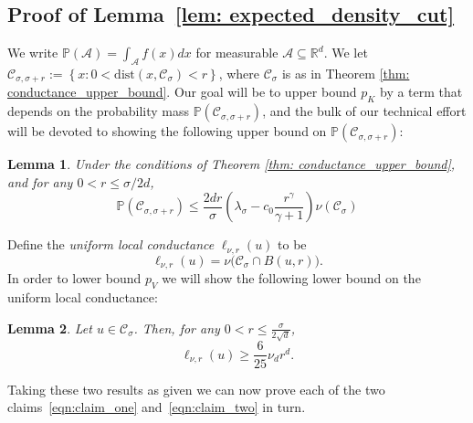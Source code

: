 \documentclass[11pt,twoside]{article}
\newtheorem{lemma}{Lemma}
\newcommand{\set}[1]{\left\{#1\right\}}
\newcommand{\Reals}{\mathbb{R}}
\newcommand{\Rd}{\Reals^d}
\newcommand{\1}{\mathbf{1}}
\newcommand{\dist}{\mathrm{dist}}
\newcommand{\Xbf}{X}             %
\newcommand{\Pbb}{\mathbb{P}}
\newcommand{\Cset}{\mathcal{C}}
\newcommand{\Aset}{\mathcal{A}}
\newcommand{\Csig}{\Cset_{\sigma}}
\newcommand{\Csigr}{\Cset_{\sigma,\sigma + r}}
\begin{document}
\subsection{Proof of Lemma~\ref{lem: expected_density_cut}}
We write $\Pbb(\Aset) = \int_{\Aset} f(x) dx$ for measurable $\Aset \subseteq \Rd$.
We 
let $\Csigr := \set{x: 0 < \dist(x, \Csig) < r}$, where $\Csig$ is as in Theorem \ref{thm: conductance_upper_bound}. 
Our goal will be to upper bound $p_K$ by a term that depends on the probability mass $\Pbb(\Csigr)$, 
and the bulk of our technical effort will be devoted to showing the following upper bound on $\Pbb(\Csigr)$:
\begin{lemma}
	\label{lem: expected_number_boundary_points}
	Under the conditions of Theorem \ref{thm: conductance_upper_bound}, and for any $0 < r \leq \sigma/2d$,
	\begin{equation*}
	\Pbb(\Csigr) \leq \frac{2dr}{\sigma} \left(\lambda_{\sigma} - c_0\frac{r^{\gamma}}{\gamma + 1}\right) \nu(\Csig)
	\end{equation*}	
\end{lemma}
\noindent Define the \emph{uniform local conductance} $\ell_{\nu,r}(u)$ to be
\begin{equation*}
\ell_{\nu,r}(u) = \nu\bigl(\Csig \cap B(u,r)\bigr).
\end{equation*}
In order to lower bound $p_V$ we will show the following lower bound on the uniform local conductance:
\begin{lemma}
	\label{lem: local_conductance}
	Let $u \in \Csig$. Then, for any $0 < r \leq \frac{\sigma}{2\sqrt{d}}$,
	\begin{equation*}
	\ell_{\nu,r}(u) \geq \frac{6}{25} \nu_d r^d.
	\end{equation*}
\end{lemma}
Taking these two results as given we can now prove each of the two claims~\eqref{eqn:claim_one} and~\eqref{eqn:claim_two} in turn.
\end{document}
